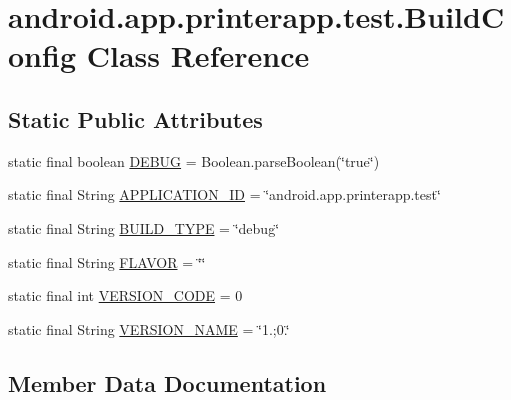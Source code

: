 \hypertarget{classandroid_1_1app_1_1printerapp_1_1test_1_1_build_config}{}\section{android.\+app.\+printerapp.\+test.\+Build\+Config Class Reference}
\label{classandroid_1_1app_1_1printerapp_1_1test_1_1_build_config}
\subsection*{Static Public Attributes}
\begin{DoxyCompactItemize}
\item 
static final boolean \hyperlink{classandroid_1_1app_1_1printerapp_1_1test_1_1_build_config_a855b36733b50329aebf36ca1f428d62e}{D\+E\+B\+UG} = Boolean.\+parse\+Boolean(\char`\"{}true\char`\"{})
\item 
static final String \hyperlink{classandroid_1_1app_1_1printerapp_1_1test_1_1_build_config_a9d76ceb3878b69b2b6d45b5d9c87a3e5}{A\+P\+P\+L\+I\+C\+A\+T\+I\+O\+N\+\_\+\+ID} = \char`\"{}android.\+app.\+printerapp.\+test\char`\"{}
\item 
static final String \hyperlink{classandroid_1_1app_1_1printerapp_1_1test_1_1_build_config_aceca516ab74484baf0a77adef65ff11e}{B\+U\+I\+L\+D\+\_\+\+T\+Y\+PE} = \char`\"{}debug\char`\"{}
\item 
static final String \hyperlink{classandroid_1_1app_1_1printerapp_1_1test_1_1_build_config_afa98cf480d39ca68e75eb2d7bb56ca8c}{F\+L\+A\+V\+OR} = \char`\"{}\char`\"{}
\item 
static final int \hyperlink{classandroid_1_1app_1_1printerapp_1_1test_1_1_build_config_ac41ebf28934bd7c75594cef9c65b3054}{V\+E\+R\+S\+I\+O\+N\+\_\+\+C\+O\+DE} = 0
\item 
static final String \hyperlink{classandroid_1_1app_1_1printerapp_1_1test_1_1_build_config_a45fc5037a6f9af22b45c64705b293653}{V\+E\+R\+S\+I\+O\+N\+\_\+\+N\+A\+ME} = \char`\"{}1.;0.\char`\"{}
\end{DoxyCompactItemize}


\subsection{Member Data Documentation}
\mbox{\label{classandroid_1_1app_1_1printerapp_1_1test_1_1_build_config_a9d76ceb3878b69b2b6d45b5d9c87a3e5}} 
